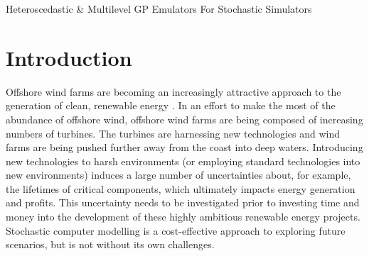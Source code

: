 \begin{chapter}{Heteroscedastic \& Multilevel GP Emulators For Stochastic Simulators\label{Ch:Hetsml}}
\section{Introduction}
Offshore wind farms are becoming an increasingly attractive approach to the generation of clean, renewable energy \citep{Hobley2019}. In an effort to make the most of the abundance of offshore wind, offshore wind farms are being composed of increasing numbers of turbines. The turbines are harnessing new technologies and wind farms are being pushed further away from the coast into deep waters. Introducing new technologies to harsh environments (or employing standard technologies into new environments) induces a large number of uncertainties about, for example, the lifetimes of critical components, which ultimately impacts energy generation and profits. This uncertainty needs to be investigated prior to investing time and money into the development of these highly ambitious renewable energy projects. Stochastic computer modelling is a cost-effective approach to exploring future scenarios, but is not without its own challenges.

\end{chapter}
